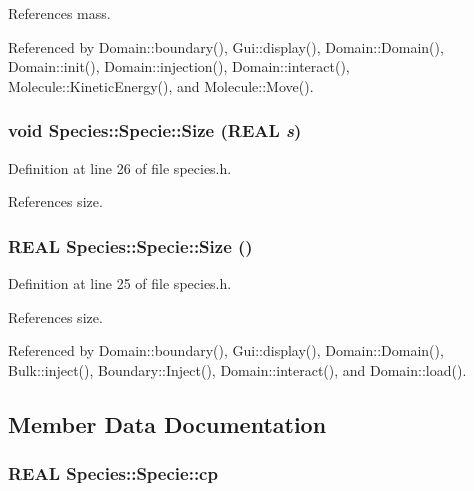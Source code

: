 References mass.

Referenced by Domain::boundary(), Gui::display(), Domain::Domain(), Domain::init(), Domain::injection(), Domain::interact(), Molecule::KineticEnergy(), and Molecule::Move().\hypertarget{classSpecies_1_1Specie_c02d605ca88d4ff258d65d0c8e666d86}{
\subsubsection[{Size}]{\setlength{\rightskip}{0pt plus 5cm}void Species::Specie::Size (REAL {\em s})}}
\label{classSpecies_1_1Specie_c02d605ca88d4ff258d65d0c8e666d86}




Definition at line 26 of file species.h.

References size.\hypertarget{classSpecies_1_1Specie_f3eb6690f38c15027c0f7b9b5f447732}{
\subsubsection[{Size}]{\setlength{\rightskip}{0pt plus 5cm}REAL Species::Specie::Size ()}}
\label{classSpecies_1_1Specie_f3eb6690f38c15027c0f7b9b5f447732}




Definition at line 25 of file species.h.

References size.

Referenced by Domain::boundary(), Gui::display(), Domain::Domain(), Bulk::inject(), Boundary::Inject(), Domain::interact(), and Domain::load().

\subsection{Member Data Documentation}
\hypertarget{classSpecies_1_1Specie_b1b4c3bb3bc7fb6f4ffb99872f7d1e2a}{
\subsubsection[{cp}]{\setlength{\rightskip}{0pt plus 5cm}REAL {\bf Species::Specie::cp}}}
\label{classSpecies_1_1Specie_b1b4c3bb3bc7fb6f4ffb99872f7d1e2a}




